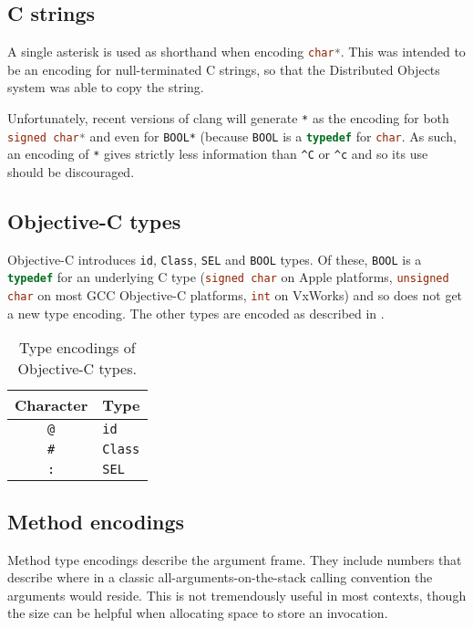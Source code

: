 \documentclass[a4paper]{report}
\newcommand{\ccode}[1]{\lstinline[language={C}]{#1}}
\newcommand{\objc}[1]{\lstinline[language={[Objective]C}]{#1}}
\begin{document}
\subsection{C strings}

A single asterisk is used as shorthand when encoding \ccode{char*}.
This was intended to be an encoding for null-terminated C strings, so that the Distributed Objects system was able to copy the string.

Unfortunately, recent versions of clang will generate \texttt{*} as the encoding for both \ccode{signed char*} and even for \objc{BOOL*} (because \objc{BOOL} is a \ccode{typedef} for \ccode{char}.
As such, an encoding of \texttt{*} gives strictly less information than \texttt{\^{}C} or \texttt{\^{}c} and so its use should be discouraged.

\subsection{Objective-C types}

Objective-C introduces \objc{id}, \objc{Class}, \objc{SEL} and \objc{BOOL} types.
Of these, \objc{BOOL} is a \ccode{typedef} for an underlying C type (\ccode{signed char} on Apple platforms, \ccode{unsigned char} on most GCC Objective-C platforms, \ccode{int} on VxWorks) and so does not get a new type encoding.
The other types are encoded as described in .

\begin{table}
	\begin{center}
		\begin{tabular}{c|l}
			Character   & Type\\\hline
			\texttt{@}  & \objc{id} \\
			\texttt{\#} & \objc{Class} \\
			\texttt{:}  & \objc{SEL}
		\end{tabular}
		\caption{\label{tab:objcencode}Type encodings of Objective-C types.}
	\end{center}
\end{table}


\subsection{Method encodings}

Method type encodings describe the argument frame.
They include numbers that describe where in a classic all-arguments-on-the-stack calling convention the arguments would reside.
This is not tremendously useful in most contexts, though the size can be helpful when allocating space to store an invocation.
\end{document}
